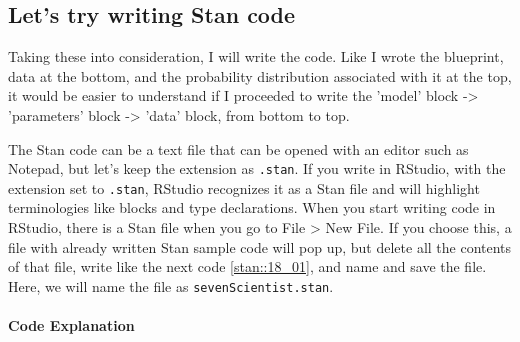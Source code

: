 \documentclass{ltjsbook}
\begin{document}
\subsection{Let's try writing Stan code}
Taking these into consideration, I will write the code. Like I wrote the blueprint, data at the bottom, and the probability distribution associated with it at the top, it would be easier to understand if I proceeded to write the 'model' block -> 'parameters' block -> 'data' block, from bottom to top.

The Stan code can be a text file that can be opened with an editor such as Notepad, but let's keep the extension as \texttt{.stan}. If you write in RStudio, with the extension set to \texttt{.stan}, RStudio recognizes it as a Stan file and will highlight terminologies like blocks and type declarations. When you start writing code in RStudio, there is a Stan file when you go to File > New File. If you choose this, a file with already written Stan sample code will pop up, but delete all the contents of that file, write like the next code \ref{stan::18_01}, and name and save the file. Here, we will name the file as \texttt{sevenScientist.stan}.


\paragraph{Code Explanation}

\end{document}
